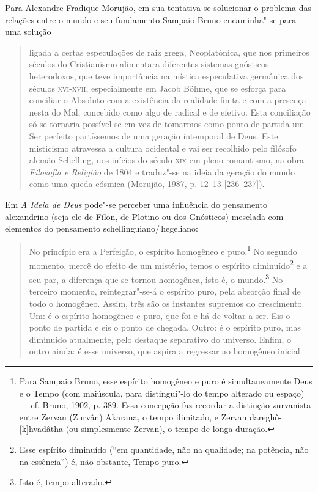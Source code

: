 Para Alexandre Fradique Morujão, em sua tentativa se solucionar o
problema das relações entre o mundo e seu fundamento Sampaio
Bruno encaminha"-se para uma solução 

\begin{quote}
ligada a certas especulações de raiz grega, Neoplatônica, que nos
primeiros séculos do Cristianismo alimentara diferentes sistemas
gnósticos heterodoxos, que teve importância na mística
especulativa germânica dos séculos \textsc{xvi}-\textsc{xvii}, especialmente em
Jacob Böhme, que se esforça para conciliar o Absoluto com a
existência da realidade finita e com a presença nesta do Mal,
concebido como algo de radical e de efetivo. Esta conciliação só
se tornaria possível se em vez de tomarmos como ponto de partida
um Ser perfeito partíssemos de uma geração intemporal de Deus.
Este misticismo atravessa a cultura ocidental e vai ser
recolhido pelo filósofo alemão Schelling, nos inícios do século
\textsc{xix} em pleno romantismo, na obra \emph{Filosofia e Religião}
de 1804 e traduz"-se na ideia da geração do mundo como uma queda
cósmica (Morujão, 1987, p. 12--13 [236--237]).
\end{quote}

Em \emph{A Ideia de Deus} pode"-se perceber uma influência do
pensamento alexandrino (seja ele de Fílon, de Plotino ou dos
Gnósticos) mesclada com elementos do pensamento
schellinguiano/\,hegeliano: 

\begin{quote}
No princípio era a Perfeição, o espírito homogêneo e
puro.\footnote{ Para Sampaio Bruno, esse espírito homogêneo e
puro é simultaneamente Deus e o Tempo (com maiúscula, para
distingui"-lo do tempo alterado ou espaço) --- cf. Bruno, 1902, p.
389. Essa concepção faz recordar a distinção zurvanista entre
Zervan (Zurvân) Akarana, o tempo ilimitado, e Zervan
dareghô-[k]hvadâtha (ou simplesmente Zervan), o tempo de longa
duração.} No segundo momento, mercê do efeito de um mistério,
temos o espírito diminuído\footnote{ Esse espírito diminuído
(“em quantidade, não na qualidade; na potência, não na
essência”) é, não obstante, Tempo puro.} e a seu par, a
diferença que se tornou homogênea, isto é, o mundo.\footnote{
Isto é, tempo alterado.} No terceiro momento, reintegrar"-se-á o
espírito puro, pela absorção final de todo o homogêneo. Assim,
três são os instantes supremos do crescimento. Um: é o espírito
homogêneo e puro, que foi e há de voltar a ser. Eis o ponto de
partida e eis o ponto de chegada. Outro: é o espírito puro, mas
diminuído atualmente, pelo destaque separativo do universo.
Enfim, o outro ainda: é esse universo, que aspira a regressar ao
homogêneo inicial. 
\end{quote}

